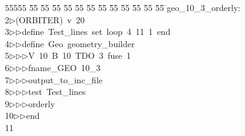 %
%
\begin{tabbing}
55555 \= 55 \= 55 \= 55 \= 55 \= 55 \= 55 \= 55 \= 55 \= 55 \= 55 \= 55 \= 55 \= \>geo\_10\_3\_orderly:\\[0pt]
2\>$\triangleright$\>(ORBITER)\ v\ 20\ \\[0pt]
3\>$\triangleright$\>$\triangleright$\>define\ Test\_lines\ set\ loop\ 4\ 11\ 1\ end\ \\[0pt]
4\>$\triangleright$\>$\triangleright$\>define\ Geo\ geometry\_builder\ \\[0pt]
5\>$\triangleright$\>$\triangleright$\>$\triangleright$\>V\ 10\ B\ 10\ TDO\ 3\ fuse\ 1\ \\[0pt]
6\>$\triangleright$\>$\triangleright$\>$\triangleright$\>fname\_GEO\ 10\_3\ \\[0pt]
7\>$\triangleright$\>$\triangleright$\>$\triangleright$\>output\_to\_inc\_file\ \\[0pt]
8\>$\triangleright$\>$\triangleright$\>$\triangleright$\>test\ Test\_lines\ \\[0pt]
9\>$\triangleright$\>$\triangleright$\>$\triangleright$\>orderly\ \\[0pt]
10\>$\triangleright$\>$\triangleright$\>end\\[0pt]
11\>\end{tabbing}
